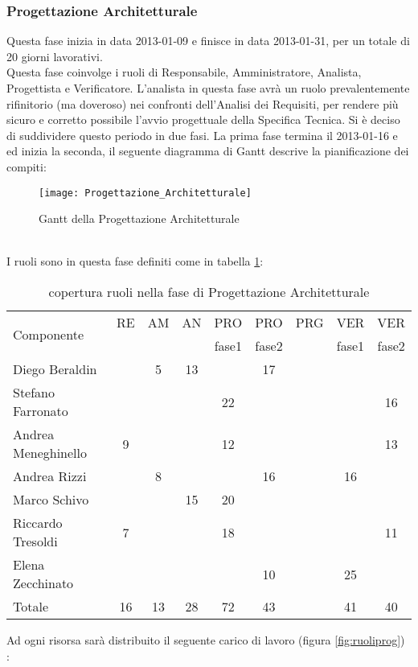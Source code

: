 \subsubsection{Progettazione Architetturale}
Questa fase inizia in data 2013-01-09 e finisce in data 2013-01-31, per un totale di 20 giorni lavorativi. \\
Questa fase coinvolge i ruoli di Responsabile, Amministratore, Analista, Progettista e Verificatore.
L'analista in questa fase avrà un ruolo prevalentemente rifinitorio (ma doveroso) nei confronti dell'Analisi dei Requisiti, per rendere più sicuro e corretto possibile l'avvio progettuale della Specifica Tecnica.
Si è deciso di suddividere questo periodo in due fasi. La prima fase termina il 2013-01-16 e ed inizia la seconda, il seguente diagramma di Gantt descrive la pianificazione dei compiti:\\
\begin{figure}[h]
  \texttt{[image: Progettazione\_Architetturale]}
\caption{Gantt della Progettazione Architetturale }
\end{figure}\\
I ruoli sono in questa fase definiti come in tabella \ref{tab:ruoliprog}:\\
\begin{table}[h]
\centering
\begin{tabular}{|l|c|c|c|c|c|c|c|c|}
\hline
\multirow{2}{*}{Componente}& RE& AM& AN& PRO& PRO& PRG& VER& VER\\
                    &    &      &      &fase1          &fase2         &        &fase1	 &fase2\\ 
\hline
Diego Beraldin & & 5& 13& & 17& & &\\
Stefano Farronato & & & & 22& & & & 16\\
Andrea Meneghinello & 9& & & 12& & & & 13\\
Andrea Rizzi & & 8& & & 16& & 16& \\
Marco Schivo & & & 15& 20& & & & \\
Riccardo Tresoldi & 7& & & 18& & & & 11\\
Elena Zecchinato & & & & & 10& & 25& \\
\hline
Totale & 16& 13& 28& 72& 43& & 41& 40\\
\hline
\end{tabular}
\caption{copertura ruoli nella fase di Progettazione Architetturale}\label{tab:ruoliprog}
\end{table}
\clearpage
Ad ogni risorsa sarà distribuito il seguente carico di lavoro (figura \ref{fig:ruoliprog}) :\\
